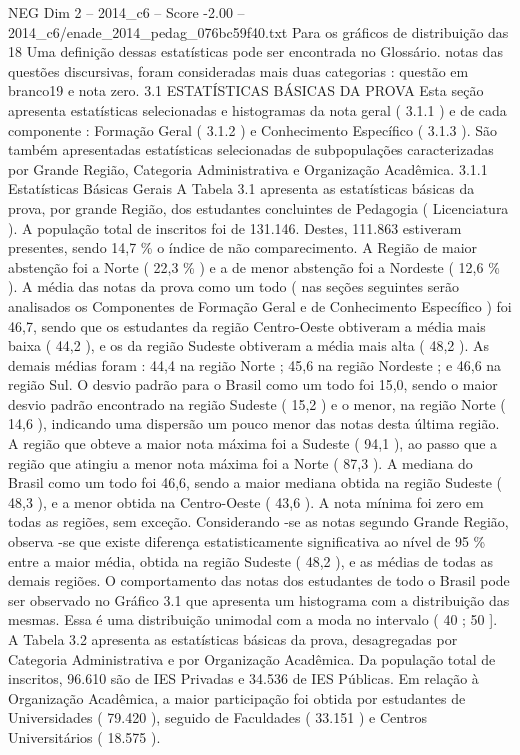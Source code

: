 \begin{textsample}{NEG Dim 2 – 2014\_c6 – Score -2.00 – 2014\_c6/enade\_2014\_pedag\_076bc59f40.txt}
Para os gráficos de distribuição das 18 Uma definição dessas estatísticas pode ser encontrada no Glossário. notas das questões discursivas, foram consideradas mais duas categorias : questão em branco19 e nota zero. 3.1 ESTATÍSTICAS BÁSICAS DA PROVA Esta seção apresenta estatísticas selecionadas e histogramas da nota geral ( 3.1.1 ) e de cada componente : Formação Geral ( 3.1.2 ) e Conhecimento Específico ( 3.1.3 ).
São também apresentadas estatísticas selecionadas de subpopulações caracterizadas por Grande Região, Categoria Administrativa e Organização Acadêmica. 3.1.1 Estatísticas Básicas Gerais A Tabela 3.1 apresenta as estatísticas básicas da prova, por grande Região, dos estudantes concluintes de Pedagogia ( Licenciatura ).
A população total de inscritos foi de 131.146.
Destes, 111.863 estiveram presentes, sendo 14,7 \% o índice de não comparecimento.
A Região de maior abstenção foi a Norte ( 22,3 \% ) e a de menor abstenção foi a Nordeste ( 12,6 \% ).
A média das notas da prova como um todo ( nas seções seguintes serão analisados os Componentes de Formação Geral e de Conhecimento Específico ) foi 46,7, sendo que os estudantes da região Centro-Oeste obtiveram a média mais baixa ( 44,2 ), e os da região Sudeste obtiveram a média mais alta ( 48,2 ).
As demais médias foram : 44,4 na região Norte ; 45,6 na região Nordeste ; e 46,6 na região Sul.
O desvio padrão para o Brasil como um todo foi 15,0, sendo o maior desvio padrão encontrado na região Sudeste ( 15,2 ) e o menor, na região Norte ( 14,6 ), indicando uma dispersão um pouco menor das notas desta última região.
A região que obteve a maior nota máxima foi a Sudeste ( 94,1 ), ao passo que a região que atingiu a menor nota máxima foi a Norte ( 87,3 ).
A mediana do Brasil como um todo foi 46,6, sendo a maior mediana obtida na região Sudeste ( 48,3 ), e a menor obtida na Centro-Oeste ( 43,6 ).
A nota mínima foi zero em todas as regiões, sem exceção.
Considerando -se as notas segundo Grande Região, observa -se que existe diferença estatisticamente significativa ao nível de 95 \% entre a maior média, obtida na região Sudeste ( 48,2 ), e as médias de todas as demais regiões.
O comportamento das notas dos estudantes de todo o Brasil pode ser observado no Gráfico 3.1 que apresenta um histograma com a distribuição das mesmas.
Essa é uma distribuição unimodal com a moda no intervalo ( 40 ; 50 ].
A Tabela 3.2 apresenta as estatísticas básicas da prova, desagregadas por Categoria Administrativa e por Organização Acadêmica.
Da população total de inscritos, 96.610 são de IES Privadas e 34.536 de IES Públicas.
Em relação à Organização Acadêmica, a maior participação foi obtida por estudantes de Universidades ( 79.420 ), seguido de Faculdades ( 33.151 ) e Centros Universitários ( 18.575 ).

\end{textsample}
